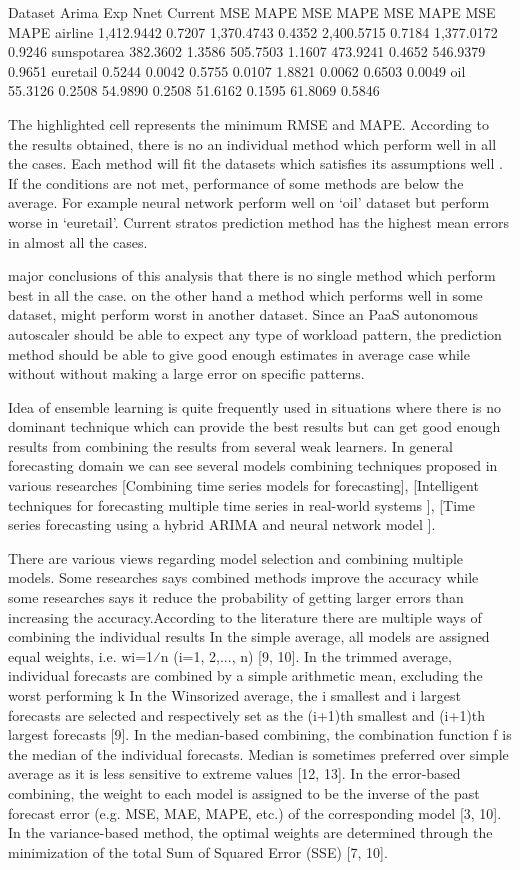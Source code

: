 Dataset
Arima
Exp
Nnet
Current
MSE
MAPE
MSE
MAPE
MSE
MAPE
MSE
MAPE
airline
1,412.9442
0.7207
1,370.4743
0.4352
2,400.5715
0.7184
1,377.0172
0.9246
sunspotarea
382.3602
1.3586
505.7503
1.1607
473.9241
0.4652
546.9379
0.9651
euretail
0.5244
0.0042
0.5755
0.0107
1.8821
0.0062
0.6503
0.0049
oil
55.3126
0.2508
54.9890
0.2508
51.6162
0.1595
61.8069
0.5846

The highlighted cell represents the minimum RMSE and MAPE. According to the results obtained, there is no an individual method which perform well in all the cases. Each method will fit the datasets which satisfies its assumptions well . If the conditions are not met, performance of some methods are below the average. For example neural network perform well on ‘oil’ dataset but perform worse in ‘euretail’.  Current stratos prediction method has the highest mean errors in almost all the cases.

major conclusions of this analysis that there is no single method which perform best in all the case. on the other hand a method which performs well in some dataset, might perform worst in another dataset.
Since an PaaS autonomous autoscaler should be able to expect any type of workload pattern, the prediction method should be able to give good enough estimates in average case while without without making a large error on specific patterns.

Idea of ensemble learning is quite frequently used in situations where there is no dominant technique which can provide the best results but can get good enough results from combining the results from several weak learners. In general forecasting domain we can see several models combining techniques  proposed in various researches [Combining time series models for forecasting], [Intelligent techniques for forecasting multiple time series in real-world systems ],
[Time series forecasting using a hybrid ARIMA and neural network model ].  

There are various views regarding model selection and combining multiple models. Some researches says combined methods improve the accuracy while some researches says it reduce the probability of getting larger errors than increasing the accuracy.According to the literature there are multiple ways of combining the individual results 
In the simple average, all models are assigned equal weights, i.e. wi=1⁄n (i=1, 2,..., n) [9, 10].
In the trimmed average, individual forecasts are combined by a simple arithmetic mean, excluding the worst performing k%
In the Winsorized average, the i smallest and i largest forecasts are selected and respectively set as the (i+1)th smallest and (i+1)th largest forecasts [9].
In the median-based combining, the combination function f is the median of the individual forecasts. Median is sometimes preferred over simple average as it is less sensitive to extreme values [12, 13].
In the error-based combining, the weight to each model is assigned to be the inverse of the past forecast error (e.g. MSE, MAE, MAPE, etc.) of the corresponding model [3, 10].
In the variance-based method, the optimal weights are determined through the minimization of the total Sum of Squared Error (SSE) [7, 10].

